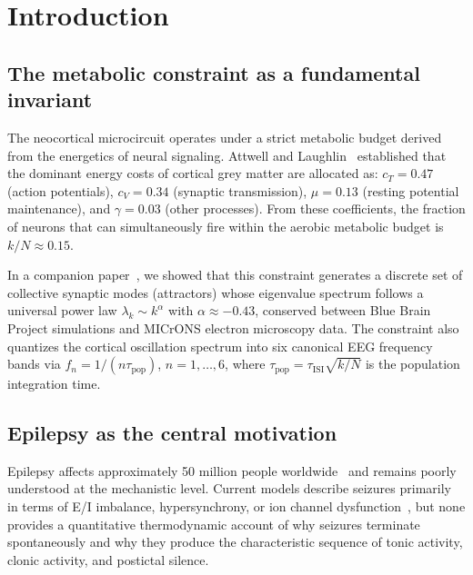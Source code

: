 \documentclass[aps,pre,twocolumn,showpacs,superscriptaddress,longbibliography]{revtex4-2}
\newcommand{\kN}{k/N}
\newcommand{\taupop}{\tau_{\mathrm{pop}}}
\newcommand{\tauISI}{\tau_{\mathrm{ISI}}}
\begin{document}

\maketitle

\section{\label{sec:intro}Introduction}

\subsection{The metabolic constraint as a fundamental invariant}

The neocortical microcircuit operates under a strict metabolic
budget derived from the energetics of neural signaling.
Attwell and Laughlin~\cite{Attwell2001} established that the
dominant energy costs of cortical grey matter are allocated as:
$c_T = 0.47$ (action potentials), $c_V = 0.34$ (synaptic
transmission), $\mu = 0.13$ (resting potential maintenance),
and $\gamma = 0.03$ (other processes). From these coefficients,
the fraction of neurons that can simultaneously fire within the
aerobic metabolic budget is $\kN \approx 0.15$.

In a companion paper~\cite{Santos2025a}, we showed that this
constraint generates a discrete set of collective synaptic
modes (attractors) whose eigenvalue spectrum follows a universal
power law $\lambda_k \sim k^\alpha$ with $\alpha \approx -0.43$,
conserved between Blue Brain Project simulations and MICrONS
electron microscopy data. The constraint also quantizes the
cortical oscillation spectrum into six canonical EEG frequency
bands via $f_n = 1/(n\taupop)$, $n = 1, \ldots, 6$, where
$\taupop = \tauISI\sqrt{\kN}$ is the population integration time.

\subsection{Epilepsy as the central motivation}

Epilepsy affects approximately 50 million people
worldwide~\cite{WHO2023} and remains poorly understood at
the mechanistic level. Current models describe seizures
primarily in terms of E/I imbalance, hypersynchrony, or ion
channel dysfunction~\cite{Stafstrom2010}, but none provides a
quantitative thermodynamic account of why seizures terminate
spontaneously and why they produce the characteristic sequence
of tonic activity, clonic activity, and postictal silence.
\end{document}
